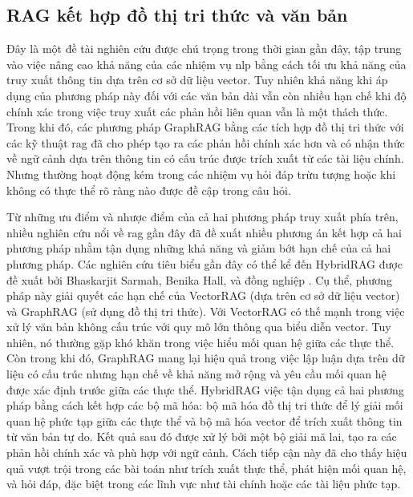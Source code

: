 \subsection{RAG kết hợp đồ thị tri thức và văn bản}
\label{subsection:graph_text_rag}
Đây là một đề tài nghiên cứu được chú trọng trong thời gian gần đây, tập trung vào việc nâng cao khả năng của các nhiệm vụ \gls{nlp} bằng cách tối ưu khả năng của truy xuất thông tin dựa trên cơ sở dữ liệu vector. Tuy nhiên khả năng khi áp dụng của phương pháp này đối với các văn bản dài vẫn còn nhiều hạn chế khi độ chính xác trong việc truy xuất các phản hồi liên quan vẫn là một thách thức. Trong khi đó, các phương pháp GraphRAG bằng các tích hợp đồ thị tri thức với các kỹ thuật \gls{rag} đã cho phép tạo ra các phản hồi chính xác hơn và có nhận thức về ngữ cảnh dựa trên thông tin có cấu trúc được trích xuất từ các tài liệu chính. Nhưng thường hoạt động kém trong các nhiệm vụ hỏi đáp trừu tượng hoặc khi không có thực thể rõ ràng nào được đề cập trong câu hỏi.


Từ những ưu điểm và nhược điểm của cả hai phương pháp truy xuất phía trên, nhiều nghiên cứu nổi về \gls{rag} gần đây đã đề xuất nhiều phương án kết hợp cả hai phương pháp nhằm tận dụng những khả năng và giảm bớt hạn chế của cả hai phương pháp. Các nghiên cứu tiêu biểu gần đây có thể kể đến HybridRAG được đề xuất bởi Bhaskarjit Sarmah, Benika Hall, và đồng nghiệp \cite{HybridRAG2024}. Cụ thể, phương pháp này giải quyết các hạn chế của VectorRAG (dựa trên cơ sở dữ liệu vector) và GraphRAG (sử dụng đồ thị tri thức). Với VectorRAG có thế mạnh trong việc xử lý văn bản không cấu trúc với quy mô lớn thông qua biểu diễn vector. Tuy nhiên, nó thường gặp khó khăn trong việc hiểu mối quan hệ giữa các thực thể. Còn trong khi đó, GraphRAG mang lại hiệu quả trong việc lập luận dựa trên dữ liệu có cấu trúc nhưng hạn chế về khả năng mở rộng và yêu cầu mối quan hệ được xác định trước giữa các thực thể.
HybridRAG việc tận dụng cả hai phương pháp bằng cách kết hợp các bộ mã hóa: bộ mã hóa đồ thị tri thức để lý giải mối quan hệ phức tạp giữa các thực thể và bộ mã hóa vector để trích xuất thông tin từ văn bản tự do. Kết quả sau đó được xử lý bởi một bộ giải mã lai, tạo ra các phản hồi chính xác và phù hợp với ngữ cảnh. Cách tiếp cận này đã cho thấy hiệu quả vượt trội trong các bài toán như trích xuất thực thể, phát hiện mối quan hệ, và hỏi đáp, đặc biệt trong các lĩnh vực như tài chính hoặc các tài liệu phức tạp.


